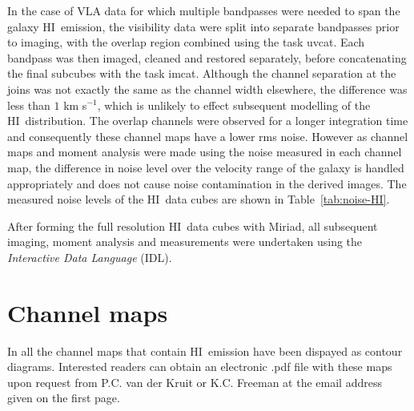 \documentclass[traditabstract]{aa} %
\newcommand\HI{H{\small I}}
\newcommand\kms{km s$^{-1}$}
\begin{document}
\begin{appendix}
In the case of VLA data for which multiple bandpasses were needed to span
the galaxy \HI\ emission, the visibility data were split into separate
bandpasses prior to imaging, with the overlap region combined using
the task {\sc uvcat}. Each bandpass was then imaged, cleaned
and restored separately, before concatenating the final subcubes with
the task {\sc imcat}. Although the channel separation at the
joins was not exactly the same as the channel width elsewhere, the
difference was less than $1$ \kms, which is unlikely to effect
subsequent modelling of the \HI\ distribution. The
overlap channels were observed for a longer integration time and
consequently these channel maps have a lower rms noise. However as
channel maps and moment analysis were made using the noise
measured in each channel map, the difference in noise level over the
velocity range of the galaxy is handled appropriately and does not
cause noise contamination in the derived images. The measured noise
levels of the \HI\ data cubes are shown in Table~\ref{tab:noise-HI}.

After forming the full resolution \HI\ data cubes with Miriad,
all subsequent imaging, moment analysis and measurements were
undertaken using the {\em Interactive Data Language} (IDL).


\section{Channel maps}

In \citep{jobrien2007} all the channel maps that contain \HI\
emission have been dispayed as contour diagrams. Interested readers can obtain 
an electronic .pdf file with these maps upon request from P.C. van der Kruit
or K.C. Freeman at the email address given on the first page.


\end{appendix}
\end{document}
